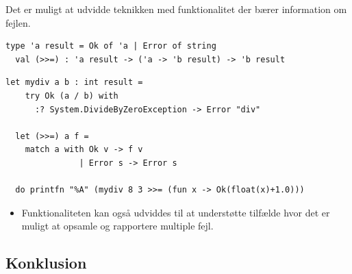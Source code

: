\documentclass[rgb]{beamer}
\begin{document}
\begin{frame}[fragile]
\begin{footnotesize}

  Det er muligt at udvidde teknikken med funktionalitet der bærer
  information om fejlen.


\begin{lstlisting}[numbers=none,frame=none,mathescape]
  type 'a result = Ok of 'a | Error of string
  val (>>=) : 'a result -> ('a -> 'b result) -> 'b result
\end{lstlisting}



\begin{lstlisting}[numbers=none,frame=none,mathescape]
  let mydiv a b : int result =
    try Ok (a / b) with
      :? System.DivideByZeroException -> Error "div"

  let (>>=) a f =
    match a with Ok v -> f v
               | Error s -> Error s

  do printfn "%A" (mydiv 8 3 >>= (fun x -> Ok(float(x)+1.0)))
\end{lstlisting}


\begin{itemize}
\item Funktionaliteten kan også udviddes til at understøtte tilfælde
  hvor det er muligt at opsamle og rapportere multiple fejl.
\end{itemize}

\end{footnotesize}
\end{frame}

\subsection*{Konklusion}
\begin{frame}[fragile]

  \vspace{3mm}
  \tableofcontents
\end{frame}
\end{document}
